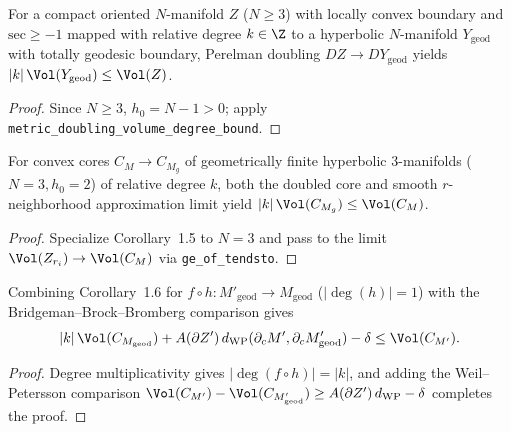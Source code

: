 \begin{corollary}
\label{cor_manifold_boundary}
\leanok
{}
For a compact oriented $N$-manifold $Z$ ($N \ge 3$) with locally convex boundary and
$\mathrm{sec} \ge -1$ mapped with relative degree $k \in \Z$ to a hyperbolic $N$-manifold
$Y_{\mathrm{geod}}$ with totally geodesic boundary, Perelman doubling $DZ \to DY_{\mathrm{geod}}$
yields $|k|\,\Vol(Y_{\mathrm{geod}}) \le \Vol(Z)$.
\end{corollary}
\begin{proof}\leanok
Since $N \ge 3$, $h_0 = N - 1 > 0$; apply \texttt{metric\_doubling\_volume\_degree\_bound}.
\end{proof}

\begin{corollary}
\label{cor_bonahon_degree}
\leanok
{}
For convex cores $C_M \to C_{M_g}$ of geometrically finite hyperbolic $3$-manifolds ($N = 3, h_0 = 2$)
of relative degree $k$, both the doubled core and smooth $r$-neighborhood approximation limit yield
$|k|\,\Vol(C_{M_g}) \le \Vol(C_M)$.
\end{corollary}
\begin{proof}\leanok
Specialize Corollary~1.5 to $N = 3$ and pass to the limit $\Vol(Z_{r_i}) \to \Vol(C_M)$ via
\texttt{ge\_of\_tendsto}.
\end{proof}

\begin{corollary}
\label{cor_unified_volume}
\leanok
{}
Combining Corollary~1.6 for $f \circ h : M'_{\mathrm{geod}} \to M_{\mathrm{geod}}$ ($|\deg(h)| = 1$)
with the Bridgeman--Brock--Bromberg comparison gives
\[
  |k|\,\Vol(C_{M_{\mathrm{geod}}}) + A(\partial Z')\,d_{\mathrm{WP}}(\partial_c M', \partial_c M'_{\mathrm{geod}}) - \delta \le \Vol(C_{M'}).
\]
\end{corollary}
\begin{proof}\leanok
Degree multiplicativity gives $|\deg(f \circ h)| = |k|$, and adding the Weil--Petersson
comparison $\Vol(C_{M'}) - \Vol(C_{M'_{\mathrm{geod}}}) \ge A(\partial Z')\,d_{\mathrm{WP}} - \delta$
completes the proof.
\end{proof}

